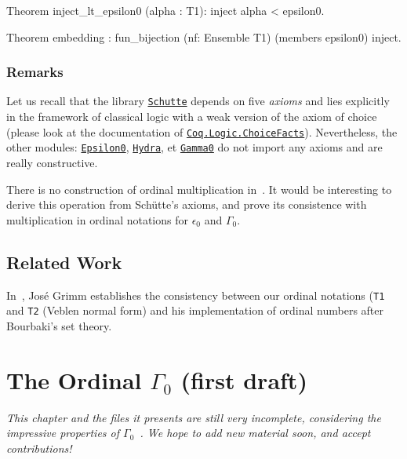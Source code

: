 {\begin{Coqsrc}
Theorem inject_lt_epsilon0 (alpha : T1):
      inject alpha < epsilon0.

Theorem embedding : 
     fun_bijection (nf: Ensemble T1)  (members epsilon0) inject.
 \end{Coqsrc}

\subsection{Remarks}
Let us recall that the library \href{../theories/html/hydras.Schutte.Schutte.html}%
{\texttt{Schutte}} depends on five \emph{axioms} and lies explicitly in the  
framework of classical logic with a weak version of the axiom of choice
(please look at the documentation of
\href{https://coq.inria.fr/distrib/current/stdlib/Coq.Logic.ChoiceFacts.html}{\texttt{Coq.Logic.ChoiceFacts}}).
Nevertheless, the other modules:
\href{../theories/html/hydras.Epsilon0.Epsilon0.html}%
{\texttt{Epsilon0}},
\href{../theories/html/hydras.Hydra.Hydra.html}%
{\texttt{Hydra}}, et 
\href{../theories/html/hydras.Gamma0.Gamma0.html}%
{\texttt{Gamma0}}
do not import any axioms and are really constructive.

\begin{project}
There is no construction of ordinal multiplication in~\cite{schutte}. 
It would be interesting to derive this operation from Schütte's axioms,
and prove its consistence with multiplication in ordinal notations for 
$\epsilon_0$ and $\Gamma_0$.
\end{project}

\section{Related Work}

In~\cite{grimm:hal-00911710}, José Grimm establishes the consistency between our ordinal notations (\texttt{T1} and \texttt{T2} (Veblen normal form) and his implementation
of ordinal numbers after Bourbaki's set theory.


\chapter{The Ordinal \texorpdfstring{$\Gamma_0$}{Gamma0} (first draft)}


\emph{This chapter and the files it presents are still very incomplete, considering the impressive properties of $\Gamma_0$~\cite{Gallier91}.  We hope to add new material soon, and accept contributions!}


}
